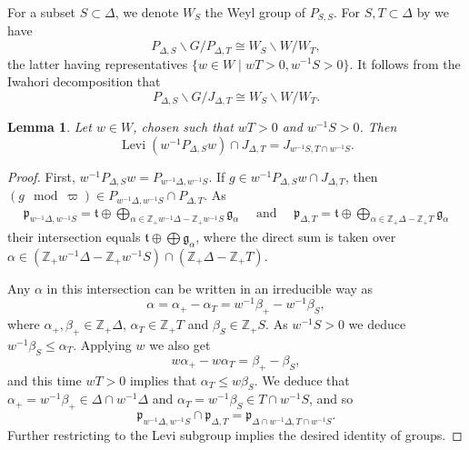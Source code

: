 \documentclass{amsart}
\newtheorem{lemma}[thm]{Lemma}
\theoremstyle{definition}
\begin{document}
{For a subset $S\subset \Delta$, we denote $W_S$ the Weyl group
of $P_{S,S}$. For  $S,T\subset \Delta$ by \cite[Prop 1.3.1]{casselman:book} we have 
\[P_{\Delta,S}\backslash G/P_{\Delta,T}\cong W_S\backslash
W/W_T,\]
the latter having representatives $\{w\in W\mid w T >0,
w^{-1}S>0\}$. It  follows  from the Iwahori decomposition that
\[P_{\Delta,S}\backslash G/J_{\Delta,T}\cong W_S\backslash
W/W_T.\]
\begin{lemma}\label{l:levi-parahoric}
Let $w\in W$, chosen such that $w T>0$ and $w^{-1}S>0$. Then
\[\operatorname{Levi}(w^{-1}P_{\Delta,S}w)\cap J_{\Delta,T}=J_{w^{-1}S,T\cap w^{-1}S}.\]
\end{lemma}
\begin{proof}
First, $w^{-1}P_{\Delta,S}w=P_{w^{-1}\Delta,w^{-1}S}$. If $g\in
w^{-1}P_{\Delta,S}w\cap J_{\Delta,T}$, then  $(g\mod\varpi)\in
P_{w^{-1}\Delta,w^{-1}S}\cap P_{\Delta,T}$. As 
\begin{align*}
\mathfrak{p}_{w^{-1}\Delta,w^{-1}S}=\mathfrak{t}\oplus\bigoplus_{\alpha\in
                                     \mathbb{Z}_{+}w^{-1}\Delta-\mathbb{Z}_{+}
                                     w^{-1}S}\mathfrak{g}_\alpha \quad \text{  and } \quad
  \mathfrak{p}_{\Delta,T}=\mathfrak{t}\oplus\bigoplus_{\alpha\in \mathbb{Z}_{+}\Delta-\mathbb{Z}_{+}T}\mathfrak{g}_\alpha 
\end{align*}
their  intersection equals  $\mathfrak{t} \oplus\bigoplus\mathfrak{g}_\alpha$, where the direct sum is taken over 
$\alpha\in (\mathbb{Z}_{+}w^{-1}\Delta-\mathbb{Z}_{+}w^{-1}S)\cap (\mathbb{Z}_{+}\Delta-\mathbb{Z}_{+}T)$.

Any $\alpha$ in this intersection can be written in an irreducible way as
\[\alpha=\alpha_{+}-\alpha_T=w^{-1}\beta_{+}-w^{-1}\beta_S,\]
where $\alpha_{+},\beta_{+}\in \mathbb{Z}_{+}\Delta$, $\alpha_T\in \mathbb{Z}_{+}T$ and  $\beta_S\in \mathbb{Z}_{+}S$.  
As $w^{-1}S>0$ we deduce  $ w^{-1}\beta_S\leqslant \alpha_T$. Applying $w$ we also get
\[w\alpha_+-w\alpha_T=\beta_+-\beta_S,\]
and this time $w T>0$ implies that $\alpha_T \leqslant w \beta_S$. 
We  deduce that $\alpha_+=w^{-1} \beta_+\in \Delta\cap w^{-1}\Delta$ and $\alpha_T=w^{-1} \beta_S \in T\cap w^{-1}S$,  and so
\[\mathfrak{p}_{w^{-1}\Delta,w^{-1}S}\cap \mathfrak{p}_{\Delta,T}=\mathfrak{p}_{\Delta\cap
  w^{-1}\Delta,T\cap w^{-1}S}.\]
Further restricting to the Levi subgroup implies the desired identity of groups. 
\end{proof}

}
\end{document}
